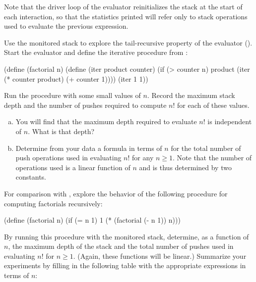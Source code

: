 \noindent
Note that the driver loop of the evaluator reinitializes the stack at the start
of each interaction, so that the statistics printed will refer only to stack
operations used to evaluate the previous expression.

\begin{exerciseGroup}
\label{Exercise 5.26}
 Use the monitored stack to
explore the tail-recursive property of the evaluator ().
Start the evaluator and define the iterative  procedure from
:

\begin{codeBlock}
(define (factorial n)
  (define (iter product counter)
    (if (> counter n)
        product
        (iter (* counter product) (+ counter 1))))
  (iter 1 1))
\end{codeBlock}

Run the procedure with some small values of \( n \).  Record the maximum stack
depth and the number of pushes required to compute \( n! \) for each of these
values.

\begin{enumerate}[a.]

\item
You will find that the maximum depth required to evaluate \( n! \) is independent
of \( n \).  What is that depth?

\item
Determine from your data a formula in terms of \( n \) for the total number of
push operations used in evaluating \( n! \) for any \( n \ge 1 \).  Note that the
number of operations used is a linear function of \( n \) and is thus determined
by two constants.

\end{enumerate}

\label{Exercise 5.27}
 For comparison with ,
explore the behavior of the following procedure for computing factorials
recursively:

\begin{codeBlock}
(define (factorial n)
  (if (= n 1) 1 (* (factorial (- n 1)) n)))
\end{codeBlock}

By running this procedure with the monitored stack, determine, as a function of
\( n \), the maximum depth of the stack and the total number of pushes used in
evaluating \( n! \) for \( n \ge 1 \).  (Again, these functions will be linear.)
Summarize your experiments by filling in the following table with the
appropriate expressions in terms of \( n \):


\end{exerciseGroup}
